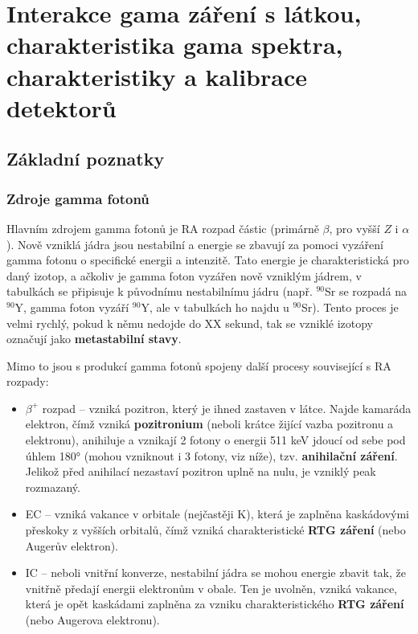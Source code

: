 \section[Interakce gamma záření]{Interakce gama záření s látkou, charakteristika gama spektra, charakteristiky a kalibrace detektorů}

\subsection{Základní poznatky}

\subsubsection{Zdroje gamma fotonů}

Hlavním zdrojem gamma fotonů je RA rozpad částic (primárně $\beta$, pro vyšší $Z$ i $\alpha$). Nově vzniklá jádra jsou nestabilní a energie se zbavují za pomoci vyzáření gamma fotonu o specifické energii a intenzitě. Tato energie je charakteristická pro daný izotop, a ačkoliv je gamma foton vyzářen nově vzniklým jádrem, v tabulkách se připisuje k původnímu nestabilnímu jádru (např. $^{90}$Sr se rozpadá na $^{90}$Y, gamma foton vyzáří $^{90}$Y, ale v tabulkách ho najdu u $^{90}$Sr). Tento proces je velmi rychlý, pokud k němu nedojde do XX sekund, tak se vzniklé izotopy označují jako \textbf{metastabilní stavy}.

Mimo to jsou s produkcí gamma fotonů spojeny další procesy související s RA rozpady:

\begin{itemize}
    \item $\beta^+$ rozpad -- vzniká pozitron, který je ihned zastaven v látce. Najde kamaráda elektron, čímž vzniká \textbf{pozitronium} (neboli krátce žijící vazba pozitronu a elektronu), anihiluje a vznikají 2 fotony o energii 511 keV jdoucí od sebe pod úhlem 180° (mohou vzniknout i 3 fotony, viz níže), tzv. \textbf{anihilační záření}. Jelikož před anihilací nezastaví pozitron uplně na nulu, je vzniklý peak rozmazaný.
    \item EC -- vzniká vakance v orbitale (nejčastěji K), která je zaplněna kaskádovými přeskoky z vyšších orbitalů, čímž vzniká charakteristické \textbf{RTG záření} (nebo Augerův elektron).
    \item IC -- neboli vnitřní konverze, nestabilní jádra se mohou energie zbavit tak, že vnitřně předají energii elektronům v obale. Ten je uvolněn, vzniká vakance, která je opět kaskádami zaplněna za vzniku charakteristického \textbf{RTG záření} (nebo Augerova elektronu).
\end{itemize}

